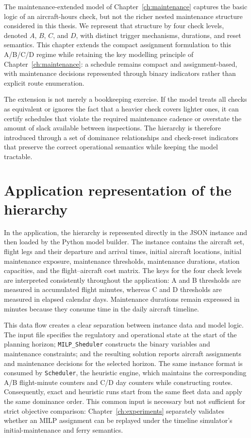 The maintenance-extended model of Chapter~\ref{ch:maintenance} captures the
basic logic of an aircraft-hours check, but not the richer nested maintenance
structure considered in this thesis. We represent that structure by four check
levels, denoted $A$, $B$, $C$, and $D$, with distinct trigger mechanisms,
durations, and reset semantics. This chapter extends the compact assignment
formulation to this A/B/C/D regime while
retaining the key modelling principle of Chapter~\ref{ch:maintenance}: a
schedule remains compact and assignment-based, with maintenance decisions
represented through binary indicators rather than explicit route enumeration.

The extension is not merely a bookkeeping exercise. If the model treats all
checks as equivalent or ignores the fact that a heavier check covers lighter
ones, it can certify schedules that violate the required maintenance cadence or
overstate the amount of slack available between inspections. The hierarchy is
therefore introduced through a set of dominance relationships and check-reset
indicators that preserve the correct operational semantics while keeping the
model tractable.

\section{Application representation of the hierarchy}
\label{sec:hierarchy_application}

In the application, the hierarchy is represented directly in the JSON instance
and then loaded by the Python model builder. The instance contains the aircraft
set, flight legs and their departure and arrival times, initial aircraft
locations, initial maintenance exposure, maintenance thresholds, maintenance
durations, station capacities, and the flight--aircraft cost matrix. The keys
for the four check levels are interpreted consistently throughout the
application: A and B thresholds are measured in accumulated flight minutes,
whereas C and D thresholds are measured in elapsed calendar days. Maintenance
durations remain expressed in minutes because they consume time in the daily
aircraft timeline.

This data flow creates a clear separation between instance data and model
logic. The input file specifies the regulatory and operational state at the
start of the planning horizon; \texttt{MILP\_Sheduler} constructs the binary
variables and maintenance constraints; and the resulting solution reports
aircraft assignments and maintenance decisions for the selected horizon. The
same instance format is consumed by \texttt{Scheduler}, the heuristic engine,
which maintains the corresponding A/B flight-minute counters and C/D day
counters while constructing routes. Consequently, exact and heuristic runs
start from the same fleet data and apply the same dominance order. This common
input is necessary but not sufficient for strict objective comparison:
Chapter~\ref{ch:experiments} separately validates whether an MILP assignment
can be replayed under the timeline simulator's initial-maintenance and ferry
semantics.

